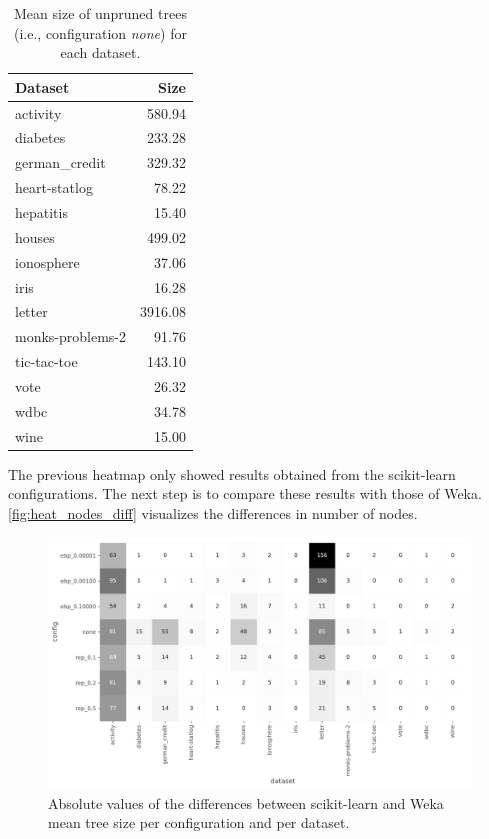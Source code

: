 \begin{table}
    \centering
    \begin{tabular}[htp]{ l r }
        Dataset & Size \\ \hline
        activity &             580.94\\
        diabetes &             233.28\\
        german\_credit &       329.32\\
        heart-statlog &         78.22\\
        hepatitis &             15.40\\
        houses &               499.02\\
        ionosphere &            37.06\\
        iris &                  16.28\\
        letter &              3916.08\\
        monks-problems-2 &      91.76\\
        tic-tac-toe &          143.10\\
        vote &                  26.32\\
        wdbc &                  34.78\\
        wine &                  15.00\\
    \end{tabular}
    \caption{Mean size of unpruned trees (i.e., configuration \emph{none}) for each dataset.}%
    \label{tbl:unpruned_sizes}
\end{table}


The previous heatmap only showed results obtained from the scikit-learn configurations. The next step is to compare these results with those of Weka. \autoref{fig:heat_nodes_diff} visualizes the differences in number of nodes.

\begin{figure}[htp]
    \includegraphics[width=\textwidth]{img/heatmap_n_nodes_diff.pdf}
    \caption{Absolute values of the differences between scikit-learn and Weka mean tree size per configuration and per dataset.}%
    \label{fig:heat_nodes_diff}
\end{figure}

